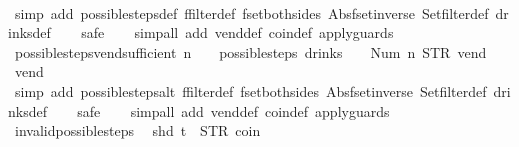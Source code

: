 \begin{isabellebody}
%
\isadelimproof
\ \ %
\endisadelimproof
%
\isatagproof
{}\isamarkupfalse%
\ {\isacharparenleft}simp\ add{\isacharcolon}\ possible{\isacharunderscore}steps{\isacharunderscore}def\ ffilter{\isacharunderscore}def\ fset{\isacharunderscore}both{\isacharunderscore}sides\ Abs{\isacharunderscore}fset{\isacharunderscore}inverse\ Set{\isachardot}filter{\isacharunderscore}def\ drinks{\isacharunderscore}def{\isacharparenright}\isanewline
\ \ \isamarkupfalse%
\ safe\isanewline
\ \ \isamarkupfalse%
\ {\isacharparenleft}simp{\isacharunderscore}all\ add{\isacharcolon}\ vend{\isacharunderscore}def\ coin{\isacharunderscore}def\ apply{\isacharunderscore}guards{\isacharparenright}%
\endisatagproof
{\isafoldproof}%
%
\isadelimproof
\isanewline
%
\endisadelimproof
\isanewline
{}\isamarkupfalse%
\ possible{\isacharunderscore}steps{\isacharunderscore}vend{\isacharunderscore}sufficient{\isacharcolon}\ {\isachardoublequoteopen}n\ {\isachargreater}\ {}\ {\isasymLongrightarrow}\ possible{\isacharunderscore}steps\ drinks\ {}\ {\isacharless}{}\ {\isacharcolon}{\isacharequal}\ Num\ n{\isachargreater}\ STR\ {\isacharprime}{\isacharprime}vend{\isacharprime}{\isacharprime}\ {\isacharbrackleft}{\isacharbrackright}\ {\isacharequal}\ {\isacharbraceleft}{\isacharbar}{\isacharparenleft}{}{\isacharcomma}\ vend{\isacharparenright}{\isacharbar}{\isacharbraceright}{\isachardoublequoteclose}\isanewline
%
\isadelimproof
\ \ %
\endisadelimproof
%
\isatagproof
{}\isamarkupfalse%
\ {\isacharparenleft}simp\ add{\isacharcolon}\ possible{\isacharunderscore}steps{\isacharunderscore}alt\ ffilter{\isacharunderscore}def\ fset{\isacharunderscore}both{\isacharunderscore}sides\ Abs{\isacharunderscore}fset{\isacharunderscore}inverse\ Set{\isachardot}filter{\isacharunderscore}def\ drinks{\isacharunderscore}def{\isacharparenright}\isanewline
\ \ \isamarkupfalse%
\ safe\isanewline
\ \ \isamarkupfalse%
\ {\isacharparenleft}simp{\isacharunderscore}all\ add{\isacharcolon}\ vend{\isacharunderscore}def\ coin{\isacharunderscore}def\ apply{\isacharunderscore}guards{\isacharparenright}%
\endisatagproof
{\isafoldproof}%
%
\isadelimproof
\isanewline
%
\endisadelimproof
\isanewline
{}\isamarkupfalse%
\ invalid{\isacharunderscore}possible{\isacharunderscore}steps{\isacharunderscore}{}{\isacharcolon}\isanewline
\ \ {\isachardoublequoteopen}shd\ t\ {\isasymnoteq}\ {\isacharparenleft}STR\ {\isacharprime}{\isacharprime}coin{\isacharprime}{\isacharprime}{\isacharcomma}\ {\isacharbrackleft}{\isacharbrackright}{\isacharparenright}\ {\isasymLongrightarrow}\isanewline

\end{isabellebody}
